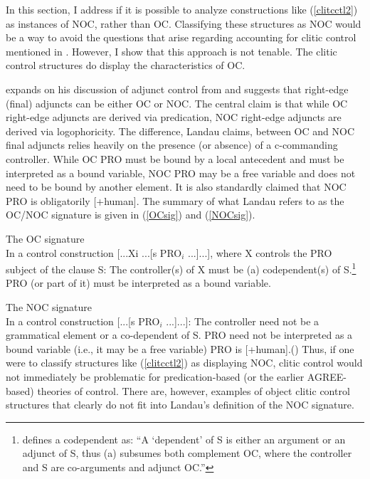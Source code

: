 \documentclass[output=paper,colorlinks,citecolor=brown]{langscibook}
\begin{document}
In this section, I address if it is possible to analyze constructions like (\ref{clitcctl2}) as instances of NOC, rather than OC. Classifying these structures as NOC would be a way to avoid the questions that arise regarding accounting for clitic control mentioned in . However, I show that this approach is not tenable. The clitic control structures do display the characteristics of OC.


\citet{landau2017} expands on his discussion of adjunct control from \citet{landau2015} and suggests that right-edge (final) adjuncts can be either OC or NOC. The central claim is that while OC right-edge adjuncts are derived via predication, NOC right-edge adjuncts are derived via logophoricity. The difference, Landau claims, between OC and NOC final adjuncts relies heavily on the presence (or absence) of a c-commanding controller. While OC PRO must be bound by a local antecedent and must be interpreted as a bound variable, NOC PRO may be a free variable and does not need to be bound by another element. It is also standardly claimed that NOC PRO is obligatorily [+human]. The summary of what Landau refers to as the OC/NOC signature is given in (\ref{OCsig}) and (\ref{NOCsig}).

\ea \label{OCsig}
The OC signature\\
In a control construction [...Xi ...[s PRO$_i$ ...]...], where X controls the PRO subject of the clause S:
\ea \label{OCa} {The controller(s) of X must be (a) codependent(s) of S.\footnote{\citet{landau2013} defines a codependent as: “A ‘dependent’ of S is either an argument or an adjunct of S, thus (a) subsumes both complement OC, where the controller and S are co-arguments and adjunct OC.”}}
\ex \label{OCb} {PRO (or part of it) must be interpreted as a bound variable.}
\z
\z


\ea \label{NOCsig}

The NOC signature\\
In a control construction [...[s PRO$_i$ ...]...]:
\ea \label{NOCa} {The controller need not be a grammatical element or a co-dependent of S.}
\ex \label{NOCb} {PRO need not be interpreted as a bound variable (i.e., it may be a free variable)}
\ex \label{NOCc} {PRO is [+human].\hfill (\citealt{landau2013})}
\z
\z
Thus, if one were to classify structures like (\ref{clitcctl2}) as displaying NOC, clitic control would not
immediately be problematic for predication-based (or the earlier AGREE-based) theories of control. There are, however, examples of object clitic control structures that clearly do not fit into Landau’s definition of the NOC signature.
\end{document}
